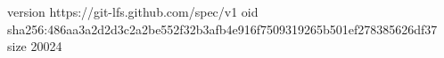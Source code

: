 version https://git-lfs.github.com/spec/v1
oid sha256:486aa3a2d2d3c2a2be552f32b3afb4e916f7509319265b501ef278385626df37
size 20024
